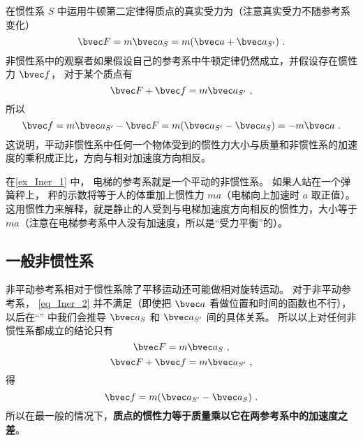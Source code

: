 在惯性系 $S$ 中运用牛顿第二定律得质点的真实受力为（注意真实受力不随参考系变化）
\begin{equation}\label{eq_Iner_3}
\bvec F = m \bvec a_{S} = m(\bvec a + \bvec a_{S'} )~.
\end{equation}
非惯性系中的观察者如果假设自己的参考系中牛顿定律仍然成立，并假设存在惯性力 $\bvec f$， 对于某个质点有
\begin{equation}\label{eq_Iner_4}
\bvec F + \bvec f = m \bvec a_{S'}~,
\end{equation}
所以
\begin{equation}\label{eq_Iner_5}
\bvec f = m \bvec a_{S'} - \bvec F = m(\bvec a_{S'} - \bvec a_{S}) =  - m\bvec a~.
\end{equation}
这说明，平动非惯性系中任何一个物体受到的惯性力大小与质量和非惯性系的加速度的乘积成正比，方向与相对加速度方向相反。

在\autoref{ex_Iner_1} 中， 电梯的参考系就是一个平动的非惯性系。 如果人站在一个弹簧秤上， 秤的示数将等于人的体重加上惯性力 $ma$（电梯向上加速时 $a$ 取正值）。 这用惯性力来解释，就是静止的人受到与电梯加速度方向相反的惯性力，大小等于 $ma$（注意在电梯参考系中人没有加速度，所以是“受力平衡”的）。

\subsection{一般非惯性系}
非平动参考系相对于惯性系除了平移运动还可能做相对旋转运动。 对于非平动参考系， \autoref{eq_Iner_2} 并不满足（即使把 $\bvec a$ 看做位置和时间的函数也不行）， 以后在“” 中我们会推导 $\bvec a_{S}$ 和 $\bvec a_{S'}$ 间的具体关系。 所以以上对任何非惯性系都成立的结论只有
\begin{equation}
\bvec F = m \bvec a_{S}~,
\end{equation}
\begin{equation}
\bvec F + \bvec f = m \bvec a_{S'}~,
\end{equation}
得
\begin{equation}
\bvec f = m( \bvec a_{S'} - \bvec a_{S})~.
\end{equation}
所以在最一般的情况下，\textbf{质点的惯性力等于质量乘以它在两参考系中的加速度之差}。


